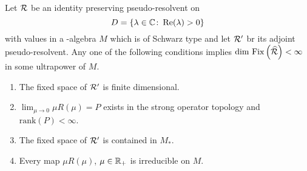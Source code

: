 \begin{theorem}\label{thm:d4-4.4}
Let $ \mathcal{R} $  be an identity preserving pseudo-resolvent on 
%
\[
	D = \{\lambda \in \mathbb{C} \colon  \mathop{}\!\mathrm{Re}(\lambda) > 0\} 
\]
%
with values in a \WA-algebra $ M $  which is of Schwarz type and let $ \mathcal{R}' $  br its adjoint pseudo-resolvent.
Any one of the following conditions implies $ \dim \mathop{}\mathrm{Fix}\left(\widehat{\mathcal{R}}\right) < \infty $  in some ultrapower of $ M $.
\begin{enumerate}[\upshape (i)]
\item
The fixed space of $ \mathcal{R}' $  is finite dimensional.

\item
$ \lim_{\mu \to 0} \mu R(\mu) = P $  exists in the strong operator topology and $ \text{rank}(P) < \infty $.

\item
The fixed space of $ \mathcal{R}' $  is contained in $ M_{*} $.

\item
Every map $ \mu R(\mu) $, $ \mu \in \mathbb{R}_{+} $ is irreducible on $ M $.
\end{enumerate}
\end{theorem}
